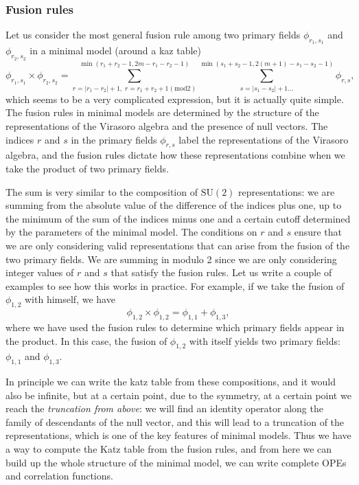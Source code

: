 \subsubsection{Fusion rules}

Let us consider the most general fusion rule among two primary fields \(\phi_{r_1, s_1}\) and \(\phi_{r_2, s_2}\) in a minimal model (around a kaz table)
\[
    \phi_{r_1, s_1} \times \phi_{r_2, s_2} = \sum_{r=|r_1 - r_2| + 1,\; r = r_1 + r_2 + 1 (\mathrm{mod} 2)}^{\min(r_1 + r_2 - 1, 2m - r_1 - r_2 - 1)} \sum_{s=|s_1 - s_2| + 1\dots }^{\min(s_1 + s_2 - 1, 2(m+1) - s_1 - s_2 - 1)} \phi_{r,s},
\]
which seems to be a very complicated expression, but it is actually quite simple. The fusion rules in minimal models are determined by the structure of the representations of the Virasoro algebra and the presence of null vectors. The indices \(r\) and \(s\) in the primary fields \(\phi_{r,s}\) label the representations of the Virasoro algebra, and the fusion rules dictate how these representations combine when we take the product of two primary fields.

The sum is very similar to the composition of \(\mathrm{SU}(2)\) representations: we are summing from the absolute value of the difference of the indices plus one, up to the minimum of the sum of the indices minus one and a certain cutoff determined by the parameters of the minimal model. The conditions on \(r\) and \(s\) ensure that we are only considering valid representations that can arise from the fusion of the two primary fields. We are summing in modulo 2 since we are only considering integer values of \(r\) and \(s\) that satisfy the fusion rules. Let us write a couple of examples to see how this works in practice. For example, if we take the fusion of \(\phi_{1,2}\) with himself, we have
\[
    \phi_{1,2} \times \phi_{1,2} = \phi_{1,1} + \phi_{1,3},
\]
where we have used the fusion rules to determine which primary fields appear in the product. In this case, the fusion of \(\phi_{1,2}\) with itself yields two primary fields: \(\phi_{1,1}\) and \(\phi_{1,3}\).

In principle we can write the katz table from these compositions, and it would also be infinite, but at a certain point, due to the symmetry, at a certain point we reach the \textit{truncation from above}: we will find an identity operator along the family of descendants of the null vector, and this will lead to a truncation of the representations, which is one of the key features of minimal models. Thus we have a way to compute the Katz table from the fusion rules, and from here we can build up the whole structure of the minimal model, we can write complete OPEs and correlation functions.

